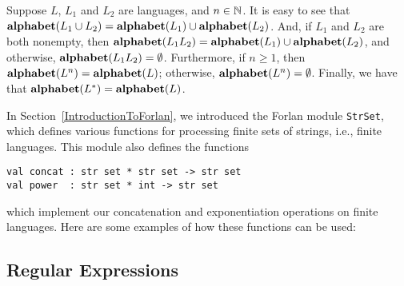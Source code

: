 %
%
%
%
Suppose $L$, $L_1$ and $L_2$ are languages, and $n\in\mathbb{N}$.  It
is easy to see that $\mathbf{alphabet}(L_1\cup L_2)=\mathbf{alphabet}(L_1)\cup\mathbf{alphabet}(L_2)$.
And, if $L_1$ and $L_2$ are both nonempty, then
$\mathbf{alphabet}(L_1L_2)=\mathbf{alphabet}(L_1)\cup\mathbf{alphabet}(L_2)$, and otherwise,
$\mathbf{alphabet}(L_1L_2)=\emptyset$.
Furthermore, if $n\geq 1$, then $\mathbf{alphabet}(L^n)=\mathbf{alphabet}(L)$; otherwise,
$\mathbf{alphabet}(L^n)=\emptyset$.
Finally, we have that $\mathbf{alphabet}(L^*)=\mathbf{alphabet}(L)$.

In Section~\ref{IntroductionToForlan}, we introduced the
Forlan module \texttt{StrSet},
which defines various functions for processing finite sets of strings,
i.e., finite languages.  This module also defines the
functions
%
%
\begin{verbatim}
val concat : str set * str set -> str set
val power  : str set * int -> str set
\end{verbatim}
which implement our concatenation and exponentiation operations
on finite languages.  Here are some examples of how these functions
can be used:


\subsection{Regular Expressions}

